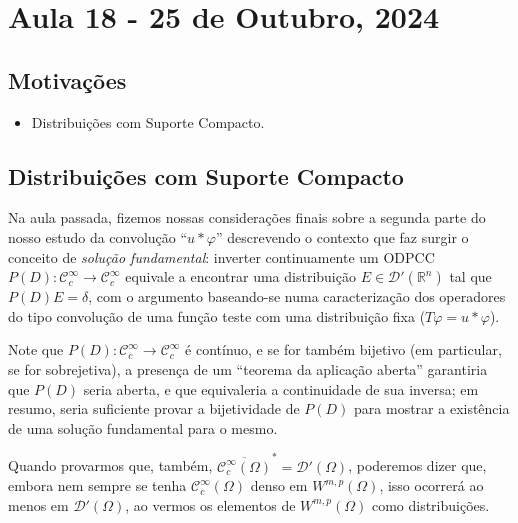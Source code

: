 \documentclass[../distribution_theory_notes.tex]{subfiles}
\begin{document}
\section{Aula 18 - 25 de Outubro, 2024}
\subsection{Motivações}
\begin{itemize}
	\item Distribuições com Suporte Compacto.
\end{itemize}
\subsection{Distribuições com Suporte Compacto}
Na aula passada, fizemos nossas considerações finais sobre a segunda parte do nosso estudo da convolução ``\(u*\varphi \)'' descrevendo o contexto que faz surgir o conceito de \textit{solução fundamental}: inverter continuamente um ODPCC \(P(D):\mathcal{C}_{c}^{\infty}\rightarrow \mathcal{C}_{c}^{\infty}\) equivale a encontrar uma distribuição \(E\in \mathcal{D}'(\mathbb{R}^{n})\) tal que \(P(D)E=\delta \), com o argumento baseando-se numa caracterização dos operadores do tipo convolução de uma função teste com uma distribuição fixa (\(T\varphi =u*\varphi \)).

Note que \(P(D):\mathcal{C}_{c}^{\infty}\rightarrow \mathcal{C}_{c}^{\infty}\) é contínuo, e se for também bijetivo (em particular, se for sobrejetiva), a presença de um ``teorema da aplicação aberta'' garantiria que \(P(D)\) seria aberta, e que equivaleria a continuidade de sua inversa; em resumo, seria suficiente provar a bijetividade de \(P(D)\) para mostrar a existência de uma solução fundamental para o mesmo.

\begin{tcolorbox}[
		skin=enhanced,
		title=Observação,
		fonttitle=\bfseries,
		colframe=black,
		colbacktitle=cyan!75!white,
		colback=cyan!15,
		colbacklower=black,
		coltitle=black,
		drop fuzzy shadow,
	]
	Quando provarmos que, também, \(\overline{\mathcal{C}_{c}^{\infty}(\Omega )}^{*} = \mathcal{D}'(\Omega )\), poderemos dizer que, embora nem sempre se tenha \(\mathcal{C}_{c}^{\infty}(\Omega )\) denso em \(W^{m, p}(\Omega )\), isso ocorrerá ao menos em \(\mathcal{D}'(\Omega )\), ao vermos os elementos de \(W^{m, p}(\Omega )\) como distribuições.
\end{tcolorbox}
\end{document}
